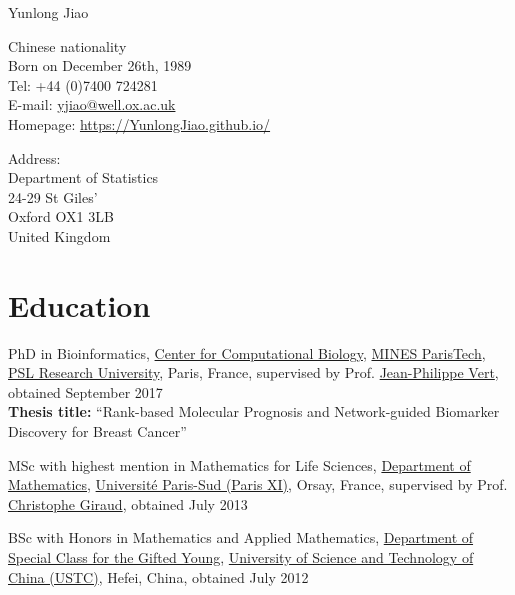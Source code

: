 \documentclass[10pt,a4paper]{article}
\def\name{Yunlong Jiao}
\renewenvironment{itemize}{
  \begin{list}{}{
    \setlength{\leftmargin}{1.2em}
  }
}{
  \end{list}
}
\begin{document}
{\huge \name}


\vspace{0.15in}

\begin{minipage}[t]{0.5\textwidth}
  Chinese nationality \\
  Born on December 26th, 1989 \\
  Tel: +44 (0)7400 724281 \\
  E-mail: \href{mailto:yjiao@well.ox.ac.uk}{yjiao@well.ox.ac.uk} \\
  Homepage: \href{https://YunlongJiao.github.io/}{https://YunlongJiao.github.io/}
\end{minipage}
\begin{minipage}[t]{0.45\textwidth}
  Address: \\
  	Department of Statistics\\
  	24-29 St Giles'\\
  	Oxford OX1 3LB\\
  	United Kingdom
\end{minipage}

\section*{Education}

\begin{itemize}
\item PhD in Bioinformatics, \href{http://cbio.ensmp.fr/}{Center for Computational Biology}, \href{http://www.ensmp.fr/}{MINES ParisTech}, \href{https://www.univ-psl.fr/}{PSL Research University}, Paris, France, supervised by Prof. \href{http://cbio.ensmp.fr/~jvert/}{Jean-Philippe Vert}, obtained September 2017\\
\textbf{Thesis title:} ``Rank-based Molecular Prognosis and Network-guided Biomarker Discovery for Breast Cancer''
\item MSc with highest mention in Mathematics for Life Sciences, \href{https://www.math.u-psud.fr/}{Department of Mathematics}, \href{http://www.u-psud.fr/}{Universit\'{e} Paris-Sud (Paris XI)}, Orsay, France, supervised by Prof. \href{http://www.cmap.polytechnique.fr/~giraud/}{Christophe Giraud}, obtained July 2013
\item BSc with Honors in Mathematics and Applied Mathematics, \href{http://scgy.ustc.edu.cn/}{Department of Special Class for the Gifted Young}, \href{http://www.ustc.edu.cn/}{University of Science and Technology of China (USTC)}, Hefei, China, obtained July 2012
\end{itemize}
\end{document}
